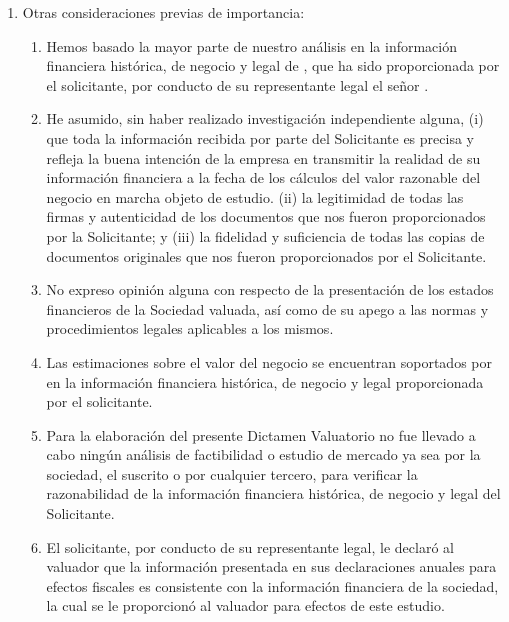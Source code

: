 \begin{enumerate}
\begin{enumerate}
	\item Otras consideraciones previas de importancia:
	\begin{enumerate}
	
		\item Hemos basado la mayor parte de nuestro an\'alisis en la informaci\'on financiera hist\'orica, de negocio y legal de \textcolor{principal}{\empresaSolicitante}, que ha sido proporcionada por el solicitante, por conducto de su representante legal el se\~nor \textcolor{principal}{\personaSolicitante}.

		\item He asumido, sin haber realizado investigaci\'on independiente alguna, (i) que toda la informaci\'on recibida por parte del Solicitante es precisa y refleja la buena intenci\'on de la empresa en transmitir la realidad de su informaci\'on financiera a la fecha de los c\'alculos del valor razonable del negocio en marcha objeto de estudio. (ii) la legitimidad de todas las firmas y autenticidad de los documentos que nos fueron proporcionados por la Solicitante; y (iii) la fidelidad y suficiencia de todas las copias de documentos originales que nos fueron proporcionados por el Solicitante.

		\item No expreso opini\'on alguna con respecto de la presentaci\'on de los estados financieros de la Sociedad valuada, as\'i como de su apego a las normas y procedimientos legales aplicables a los mismos.

		\item Las estimaciones sobre el valor del negocio se encuentran soportados por en la informaci\'on financiera hist\'orica, de negocio y legal proporcionada por el solicitante. 

		\item Para la elaboraci\'on del presente Dictamen Valuatorio no fue llevado a cabo ning\'un an\'alisis de factibilidad o estudio de mercado ya sea por la sociedad, el suscrito o por cualquier tercero, para verificar la razonabilidad de la informaci\'on financiera hist\'orica, de negocio y legal del Solicitante.

		\item El solicitante, por conducto de su representante legal, le declar\'o al valuador que la informaci\'on presentada en sus declaraciones anuales para efectos fiscales es consistente con la informaci\'on financiera de la sociedad, la cual se le proporcion\'o al valuador para efectos de este estudio.


\end{enumerate}
\end{enumerate}
\end{enumerate}
